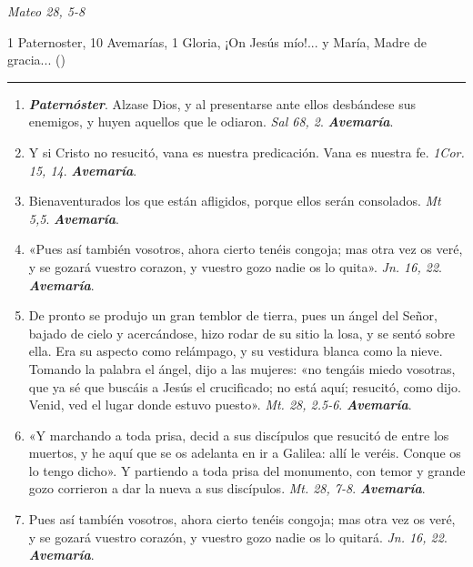 \documentclass[11pt,a4paper]{book}
\begin{document}
    \begin{flushright}
        \emph{Mateo 28, 5-8}
    \end{flushright}    

    1 Paternoster, 10 Avemarías, 1 Gloria, ¡On Jesús mío!... y María, Madre de gracia... ()

    \rule{\textwidth}{0.5pt}

    \begin{enumerate}
        \item \textbf{\emph{Paternóster}}. Alzase Dios, y al presentarse ante ellos desbándese sus enemigos, y huyen aquellos que le odiaron. \emph{Sal 68, 2}. \textbf{\emph{Avemaría}}.
        
        \item Y si Cristo no resucitó, vana es nuestra predicación. Vana es nuestra fe. \emph{1Cor. 15, 14}. \textbf{\emph{Avemaría}}.

        \item Bienaventurados los que están afligidos, porque ellos serán consolados. \emph{Mt 5,5}. \textbf{\emph{Avemaría}}.

        \item «Pues así también vosotros, ahora cierto tenéis congoja; mas otra vez os veré, y se gozará vuestro corazon, y vuestro gozo nadie os lo quita». \emph{Jn. 16, 22}. \textbf{\emph{Avemaría}}.

        \item De pronto se produjo un gran temblor de tierra, pues un ángel del Señor, bajado de cielo y acercándose, hizo rodar de su sitio la losa, y se sentó sobre ella. 
            Era su aspecto como relámpago, y su vestidura blanca como la nieve. Tomando la palabra el ángel, dijo a las mujeres: «no tengáis miedo vosotras, que ya sé que buscáis 
            a Jesús el crucificado; no está aquí; resucitó, como dijo. Venid, ved el lugar donde estuvo puesto». \emph{Mt. 28, 2.5-6}. \textbf{\emph{Avemaría}}.

        \item «Y marchando a toda prisa, decid a sus discípulos que resucitó de entre los muertos, y he aquí que se os adelanta en ir a Galilea: allí le veréis. Conque os lo tengo dicho». 
            Y partiendo a toda prisa del monumento, con temor y grande gozo corrieron a dar la nueva a sus discípulos. \emph{Mt. 28, 7-8}. \textbf{\emph{Avemaría}}.

        \item Pues así tambíén vosotros, ahora cierto tenéis congoja; mas otra vez os veré, y se gozará vuestro corazón, y vuestro gozo nadie os lo quitará. \emph{Jn. 16, 22}. \textbf{\emph{Avemaría}}.


\end{enumerate}
\end{document}
